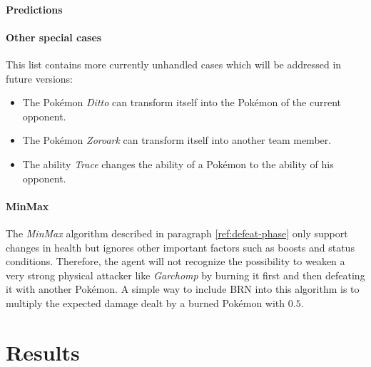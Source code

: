 \paragraph{Predictions}
\label{par:predictions}

\paragraph{Other special cases}
This list contains more currently unhandled cases which will be addressed in future versions:
\begin{itemize}
  \item The Pokémon \textit{Ditto} can transform itself into the Pokémon of the current opponent.
  \item The Pokémon \textit{Zoroark} can transform itself into another team member. 
  \item The ability \textit{Trace} changes the ability of a Pokémon to the ability of his opponent.
\end{itemize}

\paragraph{MinMax}
The \textit{MinMax} algorithm described in paragraph \ref{ref:defeat-phase} only support changes in health
but ignores other important factors such as boosts and status conditions. Therefore, the agent will 
not recognize the possibility to weaken a very strong physical attacker like \textit{Garchomp} by burning
it first and then defeating it with another Pokémon. A simple way to include \ac{BRN} into this algorithm
is to multiply the expected damage dealt by a burned Pokémon with $0.5$. 

\section{Results}
